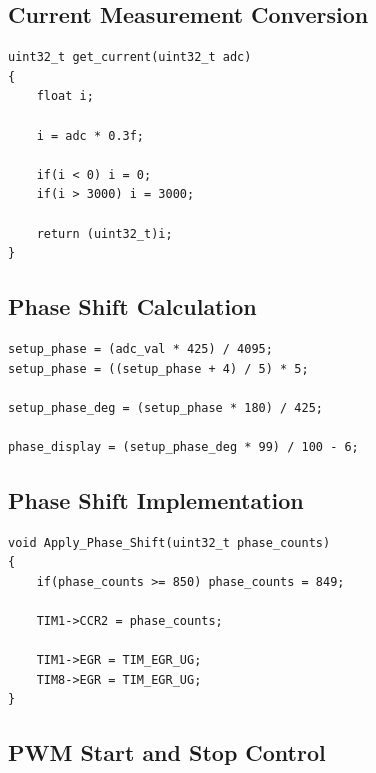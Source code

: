 
\subsection{Current Measurement Conversion}

\begin{lstlisting}[caption={Current Sensor Conversion Function}]
uint32_t get_current(uint32_t adc)
{
    float i;

    i = adc * 0.3f;

    if(i < 0) i = 0;
    if(i > 3000) i = 3000;

    return (uint32_t)i;
}
\end{lstlisting}


\subsection{Phase Shift Calculation}

\begin{lstlisting}[caption={Phase Shift Calculation from ADC Input}]
setup_phase = (adc_val * 425) / 4095;
setup_phase = ((setup_phase + 4) / 5) * 5;

setup_phase_deg = (setup_phase * 180) / 425;

phase_display = (setup_phase_deg * 99) / 100 - 6;
\end{lstlisting}


\subsection{Phase Shift Implementation}

\begin{lstlisting}[caption={Applying Phase Shift using Timer Registers}]
void Apply_Phase_Shift(uint32_t phase_counts)
{
    if(phase_counts >= 850) phase_counts = 849;

    TIM1->CCR2 = phase_counts;

    TIM1->EGR = TIM_EGR_UG;
    TIM8->EGR = TIM_EGR_UG;
}
\end{lstlisting}


\subsection{PWM Start and Stop Control}

